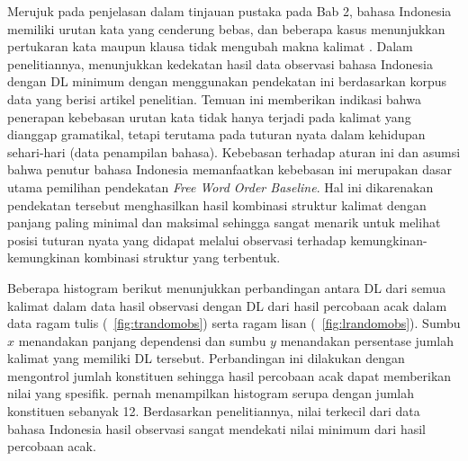Merujuk pada penjelasan dalam tinjauan pustaka pada Bab 2, bahasa Indonesia memiliki urutan kata yang cenderung bebas, dan beberapa kasus menunjukkan pertukaran kata maupun klausa tidak mengubah makna kalimat \citep[p. 209]{sneddon2010indonesian}. Dalam penelitiannya, \cite{futrell2015large} menunjukkan kedekatan hasil data observasi bahasa Indonesia dengan DL minimum dengan menggunakan pendekatan ini berdasarkan korpus data yang berisi artikel penelitian. Temuan ini memberikan indikasi bahwa penerapan kebebasan urutan kata tidak hanya terjadi pada kalimat yang dianggap gramatikal, tetapi terutama pada tuturan nyata dalam kehidupan sehari-hari (data penampilan bahasa). Kebebasan terhadap aturan ini dan asumsi bahwa penutur bahasa Indonesia memanfaatkan kebebasan ini merupakan dasar utama pemilihan pendekatan \textit{Free Word Order Baseline}. Hal ini dikarenakan pendekatan tersebut menghasilkan hasil kombinasi struktur kalimat dengan panjang paling minimal dan maksimal sehingga sangat menarik untuk melihat posisi tuturan nyata yang didapat melalui observasi terhadap kemungkinan-kemungkinan kombinasi struktur yang terbentuk. 

Beberapa histogram berikut menunjukkan perbandingan antara DL dari semua kalimat dalam data hasil observasi dengan DL dari hasil percobaan acak dalam data ragam tulis (\pic~\ref{fig:trandomobs}) serta ragam lisan (\pic~\ref{fig:lrandomobs}). Sumbu $x$ menandakan panjang dependensi dan sumbu $y$ menandakan persentase jumlah kalimat yang memiliki DL tersebut. Perbandingan ini dilakukan dengan mengontrol jumlah konstituen sehingga hasil percobaan acak dapat memberikan nilai yang spesifik. \cite{futrell2015large} pernah menampilkan histogram serupa dengan jumlah konstituen sebanyak 12. Berdasarkan penelitiannya, nilai terkecil dari data bahasa Indonesia hasil observasi sangat mendekati nilai minimum dari hasil percobaan acak.

